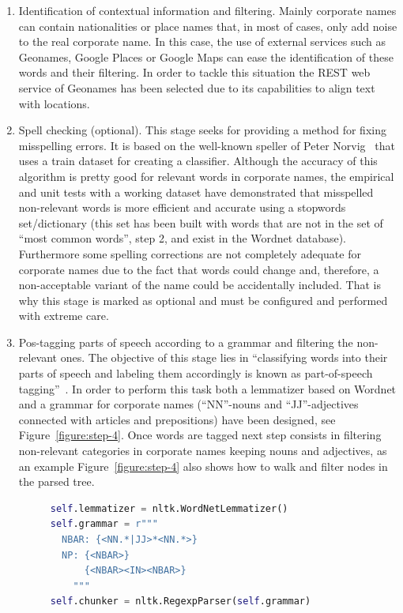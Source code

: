 \documentclass[1p,12pt]{elsarticle}
\begin{document}
\begin{enumerate}
\item Identification of contextual information and filtering. Mainly corporate names can contain nationalities or place names that, in most of 
cases, only add noise to the real corporate name. In this case, the use of external services such as Geonames, Google Places 
or Google Maps can ease the identification of these words and their filtering. In order to tackle this situation the REST web service 
of Geonames has been selected due to its capabilities to align text with locations.

\item Spell checking (optional). This stage seeks for providing a method for fixing misspelling errors. It is based on the 
well-known speller of Peter Norvig~\citep{NorvigSpelling} that uses a train dataset for creating a classifier. Although the accuracy of this 
algorithm is pretty good for relevant words in corporate names, the empirical and unit tests with a working dataset 
have demonstrated that misspelled non-relevant words is more efficient and accurate using a stopwords set/dictionary (this set has been 
built with words that are not in the set of ``most common words'', step 2, and exist in the Wordnet database). Furthermore some spelling corrections 
are not completely adequate for corporate names due to the fact that words could change and, therefore, a non-acceptable variant of the name 
could be accidentally included. That is why this stage is marked as optional and must be configured and performed with extreme care.

\item Pos-tagging parts of speech according to a grammar and filtering the non-relevant ones. The objective 
of this stage lies in ``classifying words into their parts of speech and labeling them accordingly is known as part-of-speech tagging''~\citep{LoperBird02}. In order 
to perform this task both a lemmatizer based on Wordnet and a grammar for corporate names (``NN''-nouns and ``JJ''-adjectives connected with articles and 
prepositions) have been designed, see Figure~\ref{figure:step-4}. Once words are tagged next step consists in filtering non-relevant categories 
in corporate names keeping nouns and adjectives, as an example Figure~\ref{figure:step-4} also shows how to walk and filter nodes in the parsed tree.

\begin{figure}[!h]
\begin{center}
\begin{lstlisting}[language=Python]  
self.lemmatizer = nltk.WordNetLemmatizer()
self.grammar = r"""
  NBAR: {<NN.*|JJ>*<NN.*>}   
  NP: {<NBAR>}
      {<NBAR><IN><NBAR>} 
    """
self.chunker = nltk.RegexpParser(self.grammar)


\end{lstlisting}
\end{center}
\end{figure}
\end{enumerate}
\end{document}
